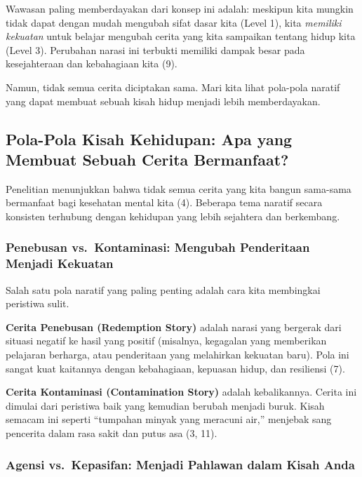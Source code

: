 \documentclass[
  letterpaper,
  DIV=11,
  numbers=noendperiod]{scrreprt}
\begin{document}
Wawasan paling memberdayakan dari konsep ini adalah: meskipun kita
mungkin tidak dapat dengan mudah mengubah sifat dasar kita (Level 1),
kita \emph{memiliki kekuatan} untuk belajar mengubah cerita yang kita
sampaikan tentang hidup kita (Level 3). Perubahan narasi ini terbukti
memiliki dampak besar pada kesejahteraan dan kebahagiaan kita (9).

Namun, tidak semua cerita diciptakan sama. Mari kita lihat pola-pola
naratif yang dapat membuat sebuah kisah hidup menjadi lebih
memberdayakan.

\subsection{\texorpdfstring{\textbf{Pola-Pola Kisah Kehidupan: Apa yang
Membuat Sebuah Cerita
Bermanfaat?}}{Pola-Pola Kisah Kehidupan: Apa yang Membuat Sebuah Cerita Bermanfaat?}}\label{pola-pola-kisah-kehidupan-apa-yang-membuat-sebuah-cerita-bermanfaat}

Penelitian menunjukkan bahwa tidak semua cerita yang kita bangun
sama-sama bermanfaat bagi kesehatan mental kita (4). Beberapa tema
naratif secara konsisten terhubung dengan kehidupan yang lebih sejahtera
dan berkembang.

\subsubsection{Penebusan vs.~Kontaminasi: Mengubah Penderitaan Menjadi
Kekuatan}\label{penebusan-vs.-kontaminasi-mengubah-penderitaan-menjadi-kekuatan}

Salah satu pola naratif yang paling penting adalah cara kita membingkai
peristiwa sulit.

\textbf{Cerita Penebusan (Redemption Story)} adalah narasi yang bergerak
dari situasi negatif ke hasil yang positif (misalnya, kegagalan yang
memberikan pelajaran berharga, atau penderitaan yang melahirkan kekuatan
baru). Pola ini sangat kuat kaitannya dengan kebahagiaan, kepuasan
hidup, dan resiliensi (7).

\textbf{Cerita Kontaminasi (Contamination Story)} adalah kebalikannya.
Cerita ini dimulai dari peristiwa baik yang kemudian berubah menjadi
buruk. Kisah semacam ini seperti ``tumpahan minyak yang meracuni air,''
menjebak sang pencerita dalam rasa sakit dan putus asa (3, 11).

\subsubsection{Agensi vs.~Kepasifan: Menjadi Pahlawan dalam Kisah
Anda}\label{agensi-vs.-kepasifan-menjadi-pahlawan-dalam-kisah-anda}
\end{document}
